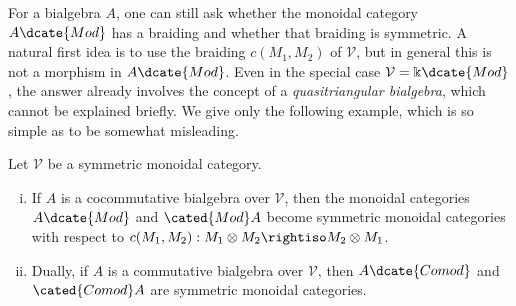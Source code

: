 
For a bialgebra $A$, one can still ask whether the monoidal category
$A\dcate{Mod}$ has a braiding and whether that braiding is symmetric. A
natural first idea is to use the braiding $c(M_1,M_2)$ of $\mathcal{V}$, but
in general this is not a morphism in $A\dcate{Mod}$. Even in the special case
$\mathcal{V}=\Bbbk\dcate{Mod}$, the answer already involves the concept of a
\emph{quasitriangular bialgebra}, which cannot be explained briefly. We give
only the following example, which is so simple as to be somewhat misleading.

\begin{proposition}\label{prop:bialgebra-mod-symmetry}
	Let $\mathcal{V}$ be a symmetric monoidal category.
	\begin{enumerate}[(i)]
		\item If $A$ is a cocommutative bialgebra over $\mathcal{V}$, then the
		monoidal categories $A\dcate{Mod}$ and $\cated{Mod}A$ become symmetric
		monoidal categories with respect to
		$c(M_1,M_2):M_1\otimes M_2\rightiso M_2\otimes M_1$.

		\item Dually, if $A$ is a commutative bialgebra over $\mathcal{V}$,
		then $A\dcate{Comod}$ and $\cated{Comod}A$ are symmetric monoidal
		categories.
	\end{enumerate}
\end{proposition}

